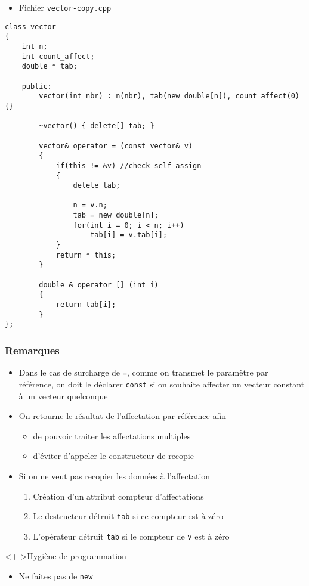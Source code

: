 \begin{frame}[containsverbatim]
\begin{itemize}
\item Fichier \texttt{vector-copy.cpp}
\end{itemize}
\begin{lstlisting}
class vector
{
	int n;
	int count_affect;
	double * tab;
	
	public:
		vector(int nbr) : n(nbr), tab(new double[n]), count_affect(0) {}				
		
		~vector() { delete[] tab; }			
		
		vector& operator = (const vector& v)
		{
			if(this != &v) //check self-assign
			{
				delete tab;
				
				n = v.n;
				tab = new double[n];
				for(int i = 0; i < n; i++)
					tab[i] = v.tab[i];
			}
			return * this;
		}

		double & operator [] (int i)
		{
			return tab[i];
		}		
};
\end{lstlisting}
\end{frame}

\begin{frame}
\frametitle{Remarques}
\begin{itemize}[<+->]
\item Dans le cas de surcharge de \texttt{=}, comme on transmet le paramètre par référence, on doit le déclarer \lstinline|const| si on souhaite affecter un vecteur constant à un vecteur quelconque
\item On retourne le résultat de l'affectation par référence afin
	\begin{itemize}
	\item de pouvoir traiter les affectations multiples
	\item d'éviter d'appeler le constructeur de recopie
	\end{itemize}
\item Si on ne veut pas recopier les données à l'affectation
	\begin{enumerate}
	\item Création d'un attribut compteur d'affectations
	\item Le destructeur détruit \texttt{tab} si ce compteur est à zéro
	\item L'opérateur détruit \texttt{tab} si le compteur de \texttt{v} est à zéro
	\end{enumerate}	
\end{itemize}
\begin{block}<+->{Hygiène de programmation}
	\begin{itemize}[<+->]
	\item Ne faites pas de \lstinline|new|
	\end{itemize}
\end{block}
\end{frame}

